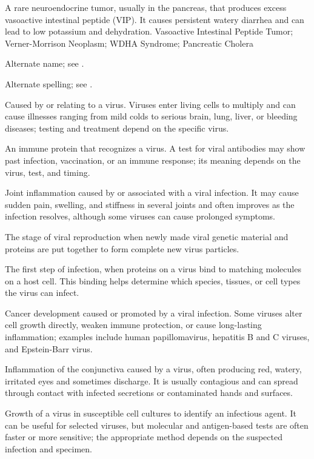  A rare neuroendocrine tumor, usually in the pancreas, that produces excess vasoactive intestinal peptide (VIP). It causes persistent watery diarrhea and can lead to low potassium and dehydration.
\synonyms
Vasoactive Intestinal Peptide Tumor; Verner-Morrison Neoplasm; WDHA Syndrome; Pancreatic Cholera

 Alternate name; see .

 Alternate spelling; see .

 Caused by or relating to a virus. Viruses enter living cells to multiply and can cause illnesses ranging from mild colds to serious brain, lung, liver, or bleeding diseases; testing and treatment depend on the specific virus.

 An immune protein that recognizes a virus. A test for viral antibodies may show past infection, vaccination, or an immune response; its meaning depends on the virus, test, and timing.

 Joint inflammation caused by or associated with a viral infection. It may cause sudden pain, swelling, and stiffness in several joints and often improves as the infection resolves, although some viruses can cause prolonged symptoms.

 The stage of viral reproduction when newly made viral genetic material and proteins are put together to form complete new virus particles.

 The first step of infection, when proteins on a virus bind to matching molecules on a host cell. This binding helps determine which species, tissues, or cell types the virus can infect.

 Cancer development caused or promoted by a viral infection. Some viruses alter cell growth directly, weaken immune protection, or cause long-lasting inflammation; examples include human papillomavirus, hepatitis B and C viruses, and Epstein-Barr virus.

 Inflammation of the conjunctiva caused by a virus, often producing red, watery, irritated eyes and sometimes discharge. It is usually contagious and can spread through contact with infected secretions or contaminated hands and surfaces.

 Growth of a virus in susceptible cell cultures to identify an infectious agent. It can be useful for
selected viruses, but molecular and antigen-based tests are often faster or more sensitive;
the appropriate method depends on the suspected infection and specimen.

